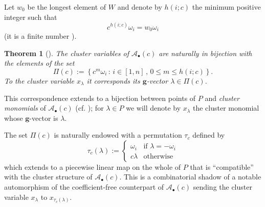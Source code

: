 \documentclass[11pt]{amsart}
\newcommand{\cA}{\mathcal{A}}
\newcommand{\bg}{\mathbf{g}}
\newtheorem{theorem}{Theorem}[section]
\theoremstyle{definition}
\numberwithin{equation}{section}
\numberwithin{figure}{section}
\begin{document}
  Let $w_0$ be the longest element of $W$ and denote by $h(i;c)$ the minimum positive integer such that
  \[
    c^{h(i;c)}\omega_i = w_0\omega_i
  \]
  (it is a finite number \cite[Proposition 1.3]{YZ08}).
  \begin{theorem}[{\cite[Theorem 1.4]{YZ08}}]
    The cluster variables of $\cA_\bullet(c)$ are naturally in bijection with the elements of the set
    \[
      \Pi(c)
      :=
      \left\{
        c^m\omega_i \, :\, i\in[1,n] \, , \, 0\leq m \leq h(i;c)
      \right\}.
    \]
    To the cluster variable $x_\lambda$ it corresponds its $\bg$-vector $\lambda\in\Pi(c)$.
  \end{theorem}
  This correspondence extends to a bijection between points of $P$ and \emph{cluster monomials} of $\cA_\bullet(c)$ (cf. \cite[Theorem 1.2]{Ste13}); for $\lambda\in P$ we will denote by $x_\lambda$ the cluster monomial whose $\bg$-vector is $\lambda$.

  The set $\Pi(c)$ is naturally endowed with a permutation $\tau_c$ defined by
  \[
    \tau_c (\lambda)
    :=
    \begin{cases}
      \omega_i  & \text{if $\lambda = -\omega_i$} \\
      c\lambda  & \text{otherwise}
    \end{cases}
  \]
  which extends to a piecewise linear map on the whole of $P$ that is ``compatible'' with the cluster structure of $\cA_\bullet(c)$.
  This is a combinatorial shadow of a notable automorphism of the coefficient-free counterpart of $\cA_\bullet(c)$ sending the cluster variable $x_\lambda$ to $x_{\tau_c(\lambda)}$.
\end{document}
